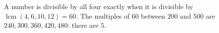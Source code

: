 A number is divisible by all four exactly when it is divisible by $\operatorname{lcm}(4,6,10,12)=60$. The multiples of $60$ between $200$ and $500$ are $240,300,360,420,480$: there are $\boxed{5}$.
